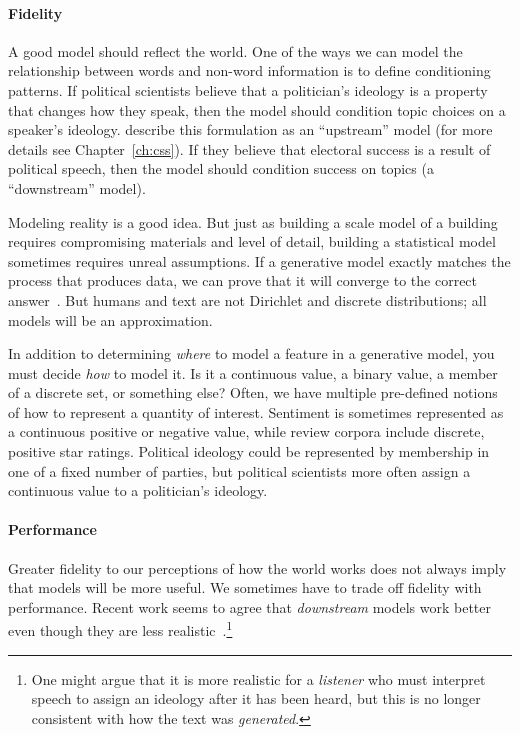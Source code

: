 \paragraph{Fidelity}

A good model should reflect the world. One of the ways we can model the relationship between words and non-word information is to define conditioning patterns.
If political scientists believe that a politician's ideology is a property that changes how they speak, then the model should condition topic choices on a speaker's ideology.
\citet{mimno-08} describe this formulation as an ``upstream'' model (for more details see Chapter~\ref{ch:css}).
If they believe that electoral success is a result of political speech, then the model should condition success on topics (a ``downstream'' model).

Modeling reality is a good idea. But just as building a scale model of
a building requires compromising materials and level of
detail, building a statistical model sometimes requires unreal assumptions.
If a generative model exactly
matches the process that produces data, we can prove that it will
converge to the correct answer~\citep{neal-93}.
But humans and text are
not Dirichlet and discrete distributions; all models will
be an approximation.

In addition to determining \emph{where} to model a feature in a
generative model, you must decide \emph{how} to model
it.  Is it a continuous value, a binary value, a member of a discrete
set, or something else?  Often, we have multiple pre-defined notions of how to
represent a quantity of interest.
Sentiment is sometimes represented as a continuous positive or negative value, while review corpora include discrete, positive star ratings.
Political ideology could be represented by membership in one of a fixed number of
parties, but political scientists more often assign a continuous value to a
politician's ideology.

\paragraph{Performance}

Greater fidelity to our perceptions of how the world works does not always imply that models will be more  useful.
We sometimes have to trade off fidelity with performance.
Recent work seems to agree that \emph{downstream} models work better even though they are
less realistic~\citep{nguyen-13:shlda}.\footnote{One might argue that it is more realistic for
  a \emph{listener} who must interpret speech to assign an ideology
  after it has been heard, but this is no longer consistent with how
  the text was \emph{generated}.} 

